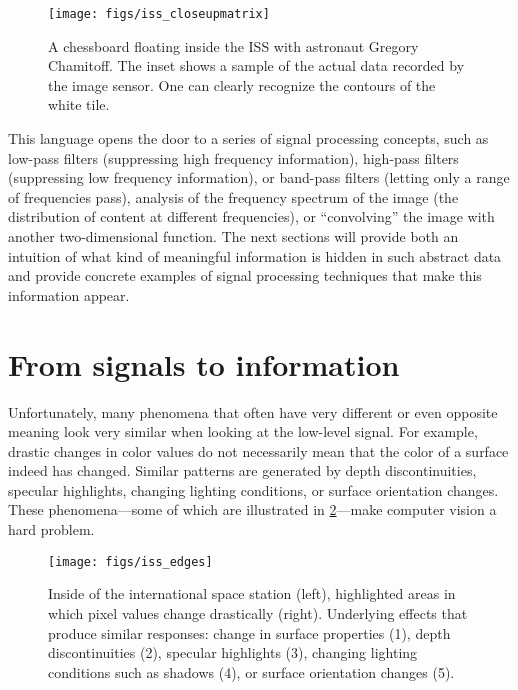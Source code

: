 \begin{figure}
    \centering
    \texttt{[image: figs/iss\_closeupmatrix]}
    \caption{A chessboard floating inside the ISS with astronaut Gregory Chamitoff. The inset shows a sample of the actual data recorded by the image sensor. One can clearly recognize the contours of the white tile.}
    \label{fig:iss_closeup}
\end{figure}

This language opens the door to a series of signal processing concepts, such as low-pass filters (suppressing high frequency information), high-pass filters (suppressing low frequency information), or band-pass filters (letting only a range of frequencies pass), analysis of the frequency spectrum of the image (the distribution of content at different frequencies), or ``convolving'' the image with another two-dimensional function. The next sections will provide both an intuition of what kind of meaningful information is hidden in such abstract data and provide concrete examples of signal processing techniques that make this information appear.

\section{From signals to information}

Unfortunately, many phenomena that often have very different or even opposite meaning look very similar when looking at the low-level signal. For example, drastic changes in color values do not necessarily mean that the color of a surface indeed has changed. Similar patterns are generated by depth discontinuities, specular highlights, changing lighting conditions, or surface orientation changes. These phenomena---some of which are illustrated in \cref{fig:iss_edges}---make computer vision a hard problem.

\begin{figure}[!htb]
    \centering
    \texttt{[image: figs/iss\_edges]}
    \caption{Inside of the international space station (left), highlighted areas in which pixel values change drastically (right). Underlying effects that produce similar responses: change in surface properties (1), depth discontinuities (2), specular highlights (3), changing lighting conditions such as shadows (4), or surface orientation changes (5).
    \label{fig:iss_edges}}
\end{figure}


